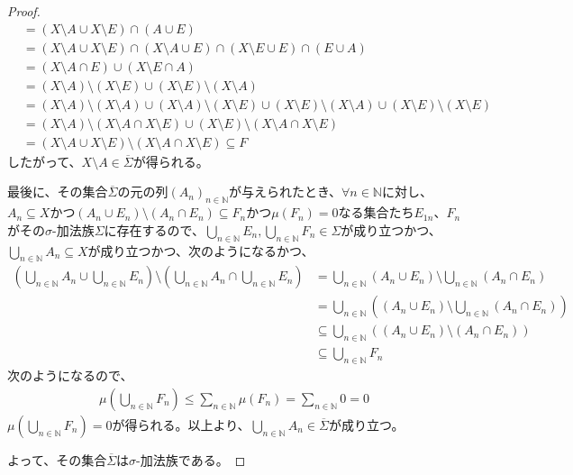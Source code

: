 \documentclass[dvipdfmx]{jsarticle}
\begin{document}
\begin{proof}
\begin{align*}
&= (X \setminus A \cup X \setminus E) \cap (A \cup E)\\
&= (X \setminus A \cup X \setminus E) \cap (X \setminus A \cup E) \cap (X \setminus E \cup E) \cap (E \cup A)\\
&= (X \setminus A \cap E) \cup (X \setminus E \cap A)\\
&= (X \setminus A) \setminus (X \setminus E) \cup (X \setminus E) \setminus (X \setminus A)\\
&= (X \setminus A) \setminus (X \setminus A) \cup (X \setminus A) \setminus (X \setminus E) \cup (X \setminus E) \setminus (X \setminus A) \cup (X \setminus E) \setminus (X \setminus E)\\
&= (X \setminus A) \setminus (X \setminus A \cap X \setminus E) \cup (X \setminus E) \setminus (X \setminus A \cap X \setminus E)\\
&= (X \setminus A \cup X \setminus E) \setminus (X \setminus A \cap X \setminus E) \subseteq F
\end{align*}
したがって、$X \setminus A \in \overline{\varSigma}$が得られる。\par
最後に、その集合$\overline{\varSigma}$の元の列$\left( A_{n} \right)_{n \in \mathbb{N}}$が与えられたとき、$\forall n \in \mathbb{N}$に対し、$A_{n} \subseteq X$かつ$\left( A_{n} \cup E_{n} \right) \setminus \left( A_{n} \cap E_{n} \right) \subseteq F_{n}$かつ$\mu\left( F_{n} \right) = 0$なる集合たち$E_{1n}$、$F_{n}$がその$\sigma$-加法族$\varSigma$に存在するので、$\bigcup_{n \in \mathbb{N}} E_{n},\bigcup_{n \in \mathbb{N}} F_{n} \in \varSigma$が成り立つかつ、$\bigcup_{n \in \mathbb{N}} A_{n} \subseteq X$が成り立つかつ、次のようになるかつ、
\begin{align*}
\left( \bigcup_{n \in \mathbb{N}} A_{n} \cup \bigcup_{n \in \mathbb{N}} E_{n} \right) \setminus \left( \bigcup_{n \in \mathbb{N}} A_{n} \cap \bigcup_{n \in \mathbb{N}} E_{n} \right) &= \bigcup_{n \in \mathbb{N}} \left( A_{n} \cup E_{n} \right) \setminus \bigcup_{n \in \mathbb{N}} \left( A_{n} \cap E_{n} \right)\\
&= \bigcup_{n \in \mathbb{N}} \left( \left( A_{n} \cup E_{n} \right) \setminus \bigcup_{n \in \mathbb{N}} \left( A_{n} \cap E_{n} \right) \right)\\
&\subseteq \bigcup_{n \in \mathbb{N}} \left( \left( A_{n} \cup E_{n} \right) \setminus \left( A_{n} \cap E_{n} \right) \right)\\
&\subseteq \bigcup_{n \in \mathbb{N}} F_{n}
\end{align*}
次のようになるので、
\begin{align*}
\mu\left( \bigcup_{n \in \mathbb{N}} F_{n} \right) \leq \sum_{n \in \mathbb{N}} {\mu\left( F_{n} \right)} = \sum_{n \in \mathbb{N}} 0 = 0
\end{align*}
$\mu\left( \bigcup_{n \in \mathbb{N}} F_{n} \right) = 0$が得られる。以上より、$\bigcup_{n \in \mathbb{N}} A_{n} \in \overline{\varSigma}$が成り立つ。\par
よって、その集合$\overline{\varSigma}$は$\sigma$-加法族である。
\end{proof}
\end{document}
